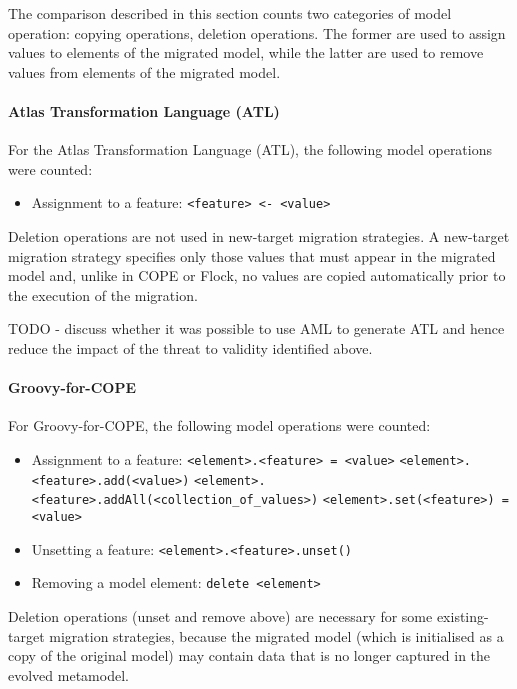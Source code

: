 The comparison described in this section counts two categories of model operation: copying operations, deletion operations. The former are used to assign values to elements of the migrated model, while the latter are used to remove values from elements of the migrated model.

\paragraph{Atlas Transformation Language (ATL)}
For the Atlas Transformation Language (ATL), the following model operations were counted:
	
\begin{itemize}
	\item Assignment to a feature:
	\subitem \texttt{<feature> <- <value>} 
\end{itemize}

Deletion operations are not used in new-target migration strategies. A new-target migration strategy specifies only those values that must appear in the migrated model and, unlike in COPE or Flock, no values are copied automatically prior to the execution of the migration.

TODO - discuss whether it was possible to use AML to generate ATL and hence reduce the impact of the threat to validity identified above.

\paragraph{Groovy-for-COPE}
For Groovy-for-COPE, the following model operations were counted:

\begin{itemize}
	\item Assignment to a feature:
	\subitem \texttt{<element>.<feature> = <value>}
	\subitem \texttt{<element>.<feature>.add(<value>)}
	\subitem \texttt{<element>.<feature>.addAll(<collection\_of\_values>)}
	\subitem \texttt{<element>.set(<feature>) = <value>}
	
	\item Unsetting a feature:
	\subitem \texttt{<element>.<feature>.unset()}	
	
	\item Removing a model element:
	\subitem \texttt{delete <element>}
\end{itemize}

Deletion operations (unset and remove above) are necessary for some existing-target migration strategies, because the migrated model (which is initialised as a copy of the original model) may contain data that is no longer captured in the evolved metamodel.

